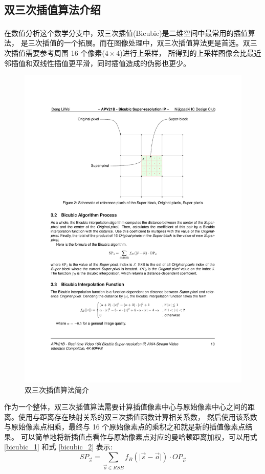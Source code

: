 \documentclass[12pt, a4paper, oneside]{ctexbook}
\begin{document}
	\subsection{双三次插值算法介绍}
	在数值分析这个数学分支中，双三次插值(Bicubic)\textsuperscript{\cite{10}\cite{11}}是二维空间中最常用的插值算法，
	是三次插值的一个拓展。而在图像处理中，双三次插值算法更是首选。双三次插值需要参考周围 16 个像素($4 \times 4$)进行上采样，
	所得到的上采样图像会比最近邻插值和双线性插值更平滑，同时插值造成的伪影也更少。
	\begin{figure}[h]
		\centering
		\includegraphics[scale=0.8]{./pic/bicubic-introduction.pdf}
		\caption{双三次插值算法简介}
		\label{bicubic_introduction}
	\end{figure}
	\par
	作为一个整体，双三次插值算法需要计算插值像素中心与原始像素中心之间的距离。使用与距离存在映射关系的双三次插值函数计算相关系数，
	然后使用该系数与原始像素点相乘，最终与 16 个原始像素点的乘积之和就是新的插值像素点结果。
	可以简单地将新插值点看作与原始像素点对应的曼哈顿距离加权，可以用式 \ref{bicubic_1} 和式 \ref{bicubic_2} 表示:
	\begin{equation}
		SP_{\vec{s}}=\sum_{\vec{o}\in{RSB}}f_B(\vert\vec{s}-\vec{o}\vert)\cdot OP_{\vec{o}}		
		\label{bicubic_1}
	\end{equation}	
	
\end{document}
